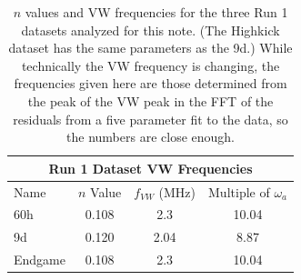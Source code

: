 \documentclass[12pt,letterpaper]{article}
\def\gmtwo{$g-2$\xspace}
\def\wa{$\omega_{a}$\xspace}
\begin{document}
\begin{table}[]
\centering
\setlength\tabcolsep{10pt}
\renewcommand{\arraystretch}{1.2}
\begin{tabular*}{.8\linewidth}{@{\extracolsep{\fill}}lccc}
  \hline
    \multicolumn{4}{c}{\textbf{Run 1 Dataset VW Frequencies}} \\
  \hline\hline
    Name & $n$ Value & $f_{VW}$ (MHz) & Multiple of \wa \\
  \hline
    60h &  0.108 & 2.3 & 10.04\\
    9d & 0.120 & 2.04 & 8.87 \\
    Endgame & 0.108 & 2.3 & 10.04 \\
  \hline
\end{tabular*}
\caption[Run 1 datasets]{$n$ values and VW frequencies for the three Run 1 datasets analyzed for this note. (The Highkick dataset has the same parameters as the 9d.) While technically the VW frequency is changing, the frequencies given here are those determined from the peak of the VW peak in the FFT of the residuals from a five parameter fit to the data, so the numbers are close enough.}
\label{tab:Run1Datasets}
\end{table}


\end{document}

